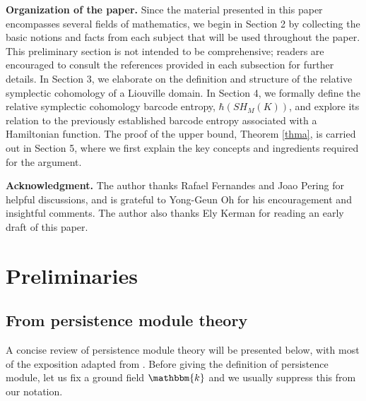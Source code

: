 \documentclass[12pt]{amsart}
\theoremstyle{definition}
\begin{document}
\vspace{0.2cm}



\noindent
\textbf{Organization of the paper.} 
Since the material presented in this paper encompasses several fields of mathematics, we begin in Section 2 by collecting the basic notions and facts from each subject that will be used throughout the paper. This preliminary section is not intended to be comprehensive; readers are encouraged to consult the references provided in each subsection for further details. In Section 3, we elaborate on the definition and structure of the relative symplectic cohomology of a Liouville domain. In Section 4, we formally define the relative symplectic cohomology barcode entropy, $\hbar(SH_M(K))$, and explore its relation to the previously established barcode entropy associated with a Hamiltonian function. The proof of the upper bound, Theorem \ref{thma}, is carried out in Section 5, where we first explain the key concepts and ingredients required for the argument.

\vspace{0.2cm}

\noindent
\textbf{Acknowledgment.} The author thanks Rafael Fernandes and Joao Pering for helpful discussions, and is grateful to Yong-Geun Oh for his encouragement and insightful comments. The author also thanks Ely Kerman for reading an early draft of this paper.

\section{Preliminaries}
\subsection{From persistence module theory}
A concise review of persistence module theory will be presented below, with most of the exposition adapted from \cite{csgo, prsz}. Before giving the definition of persistence module, let us fix a ground field $\mathbbm{k}$ and we usually suppress this from our notation.
\end{document}
